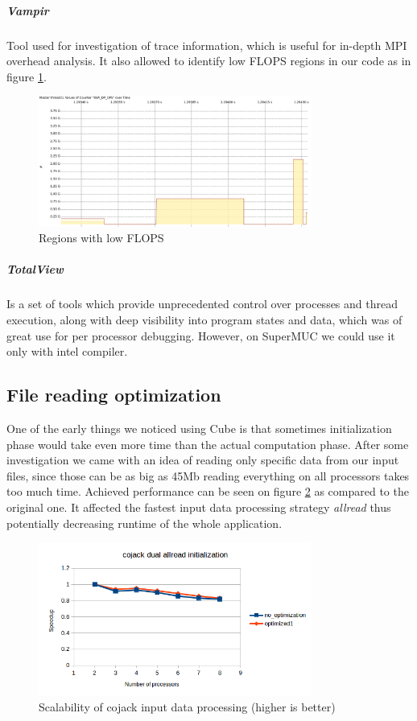 \documentclass{article}
\begin{document}
\subparagraph{Vampir}
Tool used for investigation of trace information, which is useful for in-depth MPI overhead analysis. It also allowed to identify low FLOPS regions in our code as in figure \ref{fig:7}.
\begin{figure}[h!]
	\begin{center}
		\includegraphics[width=0.8\textwidth]{iter-pent-dual-allread-8-Counter_Data_Timeline_traces.png}
		\caption{Regions with low FLOPS}		
		\label{fig:7}
	\end{center}
\end{figure}

\subparagraph{TotalView}
Is a set of tools which provide unprecedented control over processes and thread execution, along with deep visibility into program states and data, which was of great use for per processor debugging. However, on SuperMUC we could use it only with intel compiler.

\subsection{File reading optimization}
One of the early things we noticed using Cube is that sometimes initialization phase would take even more time than the actual computation phase. After some investigation we came with an idea of reading only specific data from our input files, since those can be as big as 45Mb reading everything on all processors takes too much time. Achieved performance can be seen on figure \ref{fig:13} as compared to the original one. It affected the fastest input data processing strategy \textit{allread} thus potentially decreasing runtime of the whole application.
\begin{figure}[h!]
	\begin{center}
		\includegraphics[width=0.8\textwidth]{cojack_inputalgorithm_scalability.png}
		\caption{Scalability of cojack input data processing (higher is better)}
		\label{fig:13}
	\end{center}
\end{figure}
\end{document}
